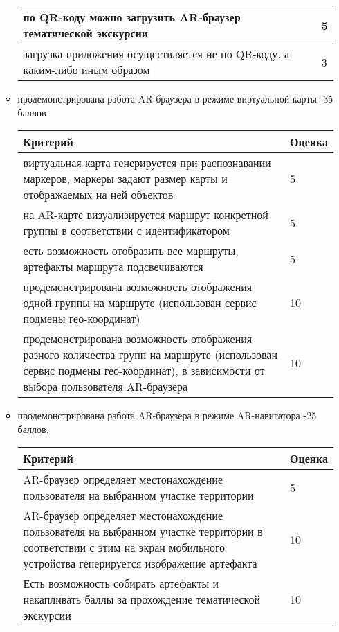 \begin{enumerate}
\begin{itemize}
\begin{tabular}{|p{7cm}|l|}
            \hline
            по QR-коду можно загрузить AR-браузер тематической экскурсии & 5 \\
            \hline
            загрузка приложения осуществляется не по QR-коду, а каким-либо иным образом & 3 \\
            \hline
        \end{tabular}
        \item продемонстрирована работа AR-браузера в режиме виртуальной карты -35 баллов
        \begin{tabular}{|p{7cm}|l|}
            \hline
            Критерий & Оценка \\
            \hline
            виртуальная карта генерируется при распознавании маркеров, маркеры задают размер карты и отображаемых на ней объектов & 5 \\
            \hline
            на AR-карте визуализируется маршрут конкретной группы в соответствии с идентификатором & 5 \\
            \hline
            есть возможность отобразить все маршруты, артефакты маршрута подсвечиваются & 5 \\
            \hline
            продемонстрирована возможность отображения одной группы на маршруте (использован сервис подмены гео-координат) & 10 \\
            \hline
            продемонстрирована возможность отображения разного количества групп на маршруте (использован сервис подмены гео-координат), в зависимости от выбора пользователя AR-браузера & 10 \\
            \hline
        \end{tabular}
        \item продемонстрирована работа AR-браузера в режиме AR-навигатора -25 баллов.
        \begin{tabular}{|p{7cm}|l|}
            \hline
            Критерий & Оценка \\
            \hline
            AR-браузер определяет местонахождение пользователя на выбранном участке территории & 5 \\
            \hline 
            AR-браузер определяет местонахождение пользователя на выбранном участке территории в соответствии с этим на экран мобильного устройства генерируется изображение артефакта & 10 \\
            \hline
            Есть возможность собирать артефакты и накапливать баллы за прохождение тематической экскурсии & 10 \\
            \hline

\end{tabular}
\end{itemize}
\end{enumerate}
